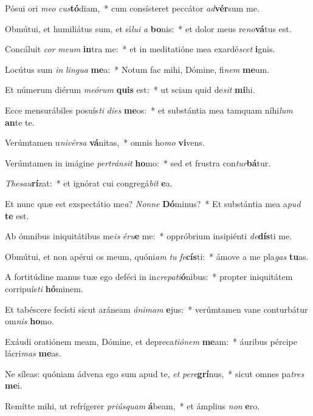 \item Pósui ori \textit{me}\textit{o} \textit{cus}\textbf{tó}diam,~* cum consísteret peccátor \textit{ad}\textbf{vér}sum me.
\item Obmútui, et humiliátus sum, et sí\textit{lu}\textit{i} \textit{a} \textbf{bo}nis:~* et dolor meus re\textit{no}\textbf{vá}tus est.
\item Concáluit \textit{cor} \textit{me}\textit{um} \textbf{in}tra me:~* et in meditatióne mea exardé\textit{scet} \textbf{i}gnis.
\item Locútus sum \textit{in} \textit{lin}\textit{gua} \textbf{me}a:~* Notum fac mihi, Dómine, fi\textit{nem} \textbf{me}um.
\item Et númerum diérum \textit{me}\textit{ó}\textit{rum} \textbf{quis} est:~* ut sciam quid de\textit{sit} \textbf{mi}hi.
\item Ecce mensurábiles posuís\textit{ti} \textit{di}\textit{es} \textbf{me}os:~* et substántia mea tamquam níhi\textit{lum} \textbf{an}te te.
\item Verúmtamen u\textit{ni}\textit{vér}\textit{sa} \textbf{vá}nitas,~* omnis ho\textit{mo} \textbf{vi}vens.
\item Verúmtamen in imágine \textit{per}\textit{tráns}\textit{it} \textbf{ho}mo:~* sed et frustra con\textit{tur}\textbf{bá}tur.
\item \textit{The}\textit{sau}\textbf{rí}zat:~* et ignórat cui congregá\textit{bit} \textbf{e}a.
\item Et nunc quæ est exspectátio me\textit{a}? \textit{Non}\textit{ne} \textbf{Dó}minus?~* Et substántia mea a\textit{pud} \textbf{te} est.
\item Ab ómnibus iniquitátibus me\textit{is} \textit{é}\textit{ru}\textbf{e} me:~* oppróbrium insipiénti \textit{de}\textbf{dís}ti me.
\item Obmútui, et non apérui os meum, quóni\textit{am} \textit{tu} \textit{fe}\textbf{cís}ti:~* ámove a me pla\textit{gas} \textbf{tu}as.
\item A fortitúdine manus tuæ ego deféci in in\textit{cre}\textit{pa}\textit{ti}\textbf{ó}nibus:~* propter iniquitátem corripuís\textit{ti} \textbf{hó}minem.
\item Et tabéscere fecísti sicut aráneam \textit{á}\textit{ni}\textit{mam} \textbf{e}jus:~* verúmtamen vane conturbátur om\textit{nis} \textbf{ho}mo.
\item Exáudi oratiónem meam, Dómine, et depreca\textit{ti}\textit{ó}\textit{nem} \textbf{me}am:~* áuribus pércipe lácri\textit{mas} \textbf{me}as.
\item Ne síleas: quóniam ádvena ego sum apud te, \textit{et} \textit{per}\textit{e}\textbf{grí}nus,~* sicut omnes pa\textit{tres} \textbf{me}i.
\item Remítte mihi, ut refrígerer \textit{pri}\textit{ús}\textit{quam} \textbf{á}beam,~* et ámplius \textit{non} \textbf{e}ro.

